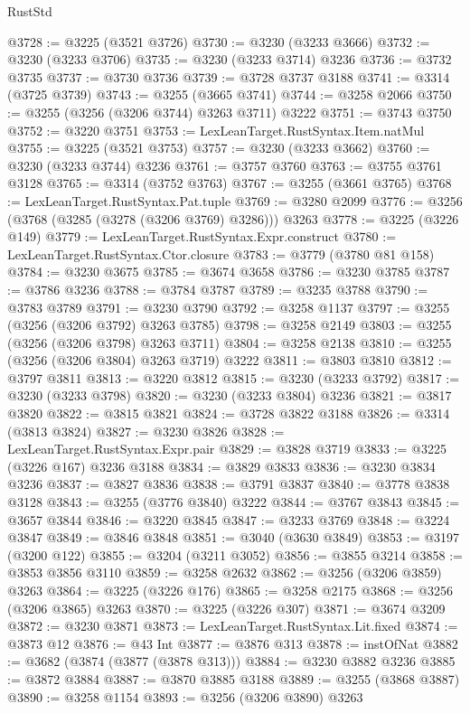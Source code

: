 \begin{lexlean}{RustStd}
\begin{coremodule}
@3728 := @3225 (@3521 @3726)
@3730 := @3230 (@3233 @3666)
@3732 := @3230 (@3233 @3706)
@3735 := @3230 (@3233 @3714) @3236
@3736 := @3732 @3735
@3737 := @3730 @3736
@3739 := @3728 @3737 @3188
@3741 := @3314 (@3725 @3739)
@3743 := @3255 (@3665 @3741)
@3744 := @3258 @2066
@3750 := @3255 (@3256 (@3206 @3744) @3263 @3711) @3222
@3751 := @3743 @3750
@3752 := @3220 @3751
@3753 := LexLeanTarget.RustSyntax.Item.natMul
@3755 := @3225 (@3521 @3753)
@3757 := @3230 (@3233 @3662)
@3760 := @3230 (@3233 @3744) @3236
@3761 := @3757 @3760
@3763 := @3755 @3761 @3128
@3765 := @3314 (@3752 @3763)
@3767 := @3255 (@3661 @3765)
@3768 := LexLeanTarget.RustSyntax.Pat.tuple
@3769 := @3280 @2099
@3776 := @3256 (@3768 (@3285 (@3278 (@3206 @3769) @3286))) @3263
@3778 := @3225 (@3226 @149)
@3779 := LexLeanTarget.RustSyntax.Expr.construct
@3780 := LexLeanTarget.RustSyntax.Ctor.closure
@3783 := @3779 (@3780 @81 @158)
@3784 := @3230 @3675
@3785 := @3674 @3658
@3786 := @3230 @3785
@3787 := @3786 @3236
@3788 := @3784 @3787
@3789 := @3235 @3788
@3790 := @3783 @3789
@3791 := @3230 @3790
@3792 := @3258 @1137
@3797 := @3255 (@3256 (@3206 @3792) @3263 @3785)
@3798 := @3258 @2149
@3803 := @3255 (@3256 (@3206 @3798) @3263 @3711)
@3804 := @3258 @2138
@3810 := @3255 (@3256 (@3206 @3804) @3263 @3719) @3222
@3811 := @3803 @3810
@3812 := @3797 @3811
@3813 := @3220 @3812
@3815 := @3230 (@3233 @3792)
@3817 := @3230 (@3233 @3798)
@3820 := @3230 (@3233 @3804) @3236
@3821 := @3817 @3820
@3822 := @3815 @3821
@3824 := @3728 @3822 @3188
@3826 := @3314 (@3813 @3824)
@3827 := @3230 @3826
@3828 := LexLeanTarget.RustSyntax.Expr.pair
@3829 := @3828 @3719
@3833 := @3225 (@3226 @167) @3236 @3188
@3834 := @3829 @3833
@3836 := @3230 @3834 @3236
@3837 := @3827 @3836
@3838 := @3791 @3837
@3840 := @3778 @3838 @3128
@3843 := @3255 (@3776 @3840) @3222
@3844 := @3767 @3843
@3845 := @3657 @3844
@3846 := @3220 @3845
@3847 := @3233 @3769
@3848 := @3224 @3847
@3849 := @3846 @3848
@3851 := @3040 (@3630 @3849)
@3853 := @3197 (@3200 @122)
@3855 := @3204 (@3211 @3052)
@3856 := @3855 @3214
@3858 := @3853 @3856 @3110
@3859 := @3258 @2632
@3862 := @3256 (@3206 @3859) @3263
@3864 := @3225 (@3226 @176)
@3865 := @3258 @2175
@3868 := @3256 (@3206 @3865) @3263
@3870 := @3225 (@3226 @307)
@3871 := @3674 @3209
@3872 := @3230 @3871
@3873 := LexLeanTarget.RustSyntax.Lit.fixed
@3874 := @3873 @12
@3876 := @43 Int
@3877 := @3876 @313
@3878 := instOfNat
@3882 := @3682 (@3874 (@3877 (@3878 @313)))
@3884 := @3230 @3882 @3236
@3885 := @3872 @3884
@3887 := @3870 @3885 @3188
@3889 := @3255 (@3868 @3887)
@3890 := @3258 @1154
@3893 := @3256 (@3206 @3890) @3263

\end{coremodule}
\end{lexlean}
